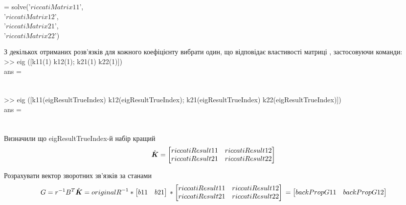 \documentclass[a4paper]{article}
\begin{document}
\begin{center}
\hfill \break
\big[ k11, k12, k21, k22 \big] = solve('${{riccatiMatrix11}}$', \\
'${{riccatiMatrix12}}$',\\
'${{riccatiMatrix21}}$',\\
'${{riccatiMatrix22}}$')\\
\end{center}
\hfill \break
\indent З декількох отриманих розв’язків для кожного коефіцієнту вибрати
один, що відповідає властивості матриці , застосовуючи команди:\\
\hfill \break
\indent >> eig ([k11(1) k12(1); k21(1) k22(1)]) \\
\indent ans = \\
 \\
 \\
\indent >> eig ([k11({{eigResultTrueIndex}}) k12({{eigResultTrueIndex}}); k21({{eigResultTrueIndex}}) k22({{eigResultTrueIndex}})]) \\
\indent ans = \\
 \\
 \\
\hfill \break
\indent Визначили що {{eigResultTrueIndex}}-й набір кращий
\[
\hat{\boldsymbol{K}} =
\begin{bmatrix}
    {{riccatiResult11}} & {{riccatiResult12}}\\
    {{riccatiResult21}} & {{riccatiResult22}} \\
\end{bmatrix}\\
\]


\hfill \break
\indent Розрахувати вектор зворотних зв’язків за станами\\

\[
G = r^{-1}B^{T}\hat{\boldsymbol{K}} =
{{originalR}}^{-1} *
\begin{bmatrix}
    {{b11}} & {{b21}}
\end{bmatrix}\\ *
\begin{bmatrix}
    {{riccatiResult11}} & {{riccatiResult12}}\\
    {{riccatiResult21}} & {{riccatiResult22}} \\
\end{bmatrix}\\ =
\begin{bmatrix}
    {{backPropG11}} & {{backPropG12}}\\
\end{bmatrix}\\
\]
\end{document}
